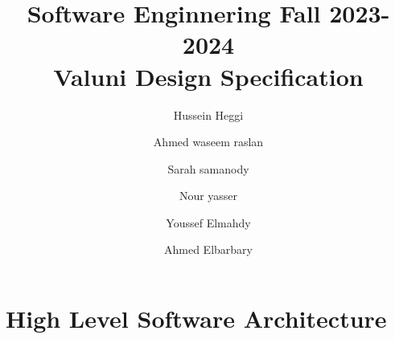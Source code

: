 \documentclass{article}
\title{Software Enginnering Fall 2023-2024 \\ Valuni Design Specification}
\author{  
Hussein Heggi 	\and
Ahmed waseem raslan 	\and
Sarah samanody 	\and
Nour yasser 	\and
Youssef Elmahdy	\and
Ahmed Elbarbary	}
\begin{document}
\maketitle 

\section{High Level Software Architecture}
\end{document}

